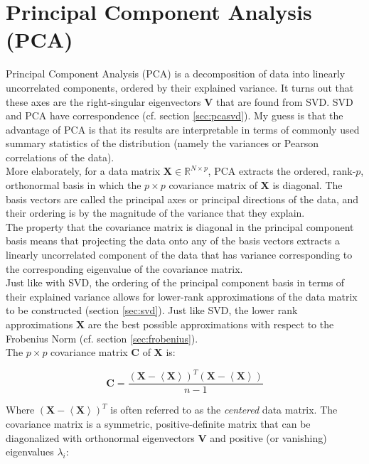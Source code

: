 \section{Principal Component Analysis (PCA)}

Principal Component Analysis (PCA) is a decomposition of data into linearly uncorrelated components, ordered by their explained variance. It turns out that these axes are the right-singular eigenvectors $\mathbf{V}$ that are found from SVD. SVD and PCA have correspondence (cf. section \ref{sec:pcasvd}). My guess is that the advantage of PCA is that its results are interpretable in terms of commonly used summary statistics of the distribution (namely the variances or Pearson correlations of the data).
\\

More elaborately, for a data matrix $\mathbf{X}\in\mathbb{R}^{N\times p}$, PCA extracts the ordered, rank-$p$, orthonormal basis in which the $p\times p$ covariance matrix of $\mathbf{X}$ is diagonal. The basis vectors are called the principal axes or principal directions of the data, and their ordering is by the magnitude of the variance that they explain. 
\\

The property that the covariance matrix is diagonal in the principal component basis means that projecting the data onto any of the basis vectors extracts a linearly uncorrelated component of the data that has variance corresponding to the corresponding eigenvalue of the covariance matrix.
\\

Just like with SVD, the ordering of the principal component basis in terms of their explained variance allows for lower-rank approximations of the data matrix to be constructed (section \ref{sec:svd}). Just like SVD, the lower rank approximations $\mathbf{X}$ are the best possible approximations with respect to the Frobenius Norm (cf. section \ref{sec:frobenius}). 
\\

The $p\times p$ covariance matrix  $\mathbf{C}$ of $\mathbf{X}$ is:

\begin{equation}
\mathbf{C} = \frac{\left(\mathbf{X}-\left<\mathbf{X}\right>\right)^T\left(\mathbf{X}-\left< \mathbf{X}\right>\right)}{n-1}
\end{equation}

Where $\left(\mathbf{X}-\left<\mathbf{X}\right>\right)^T$ is often referred to as the \textit{centered} data matrix. The covariance matrix is a symmetric, positive-definite matrix that can be diagonalized with orthonormal eigenvectors $\mathbf{V}$ and positive (or vanishing) eigenvalues $\lambda_i$:


